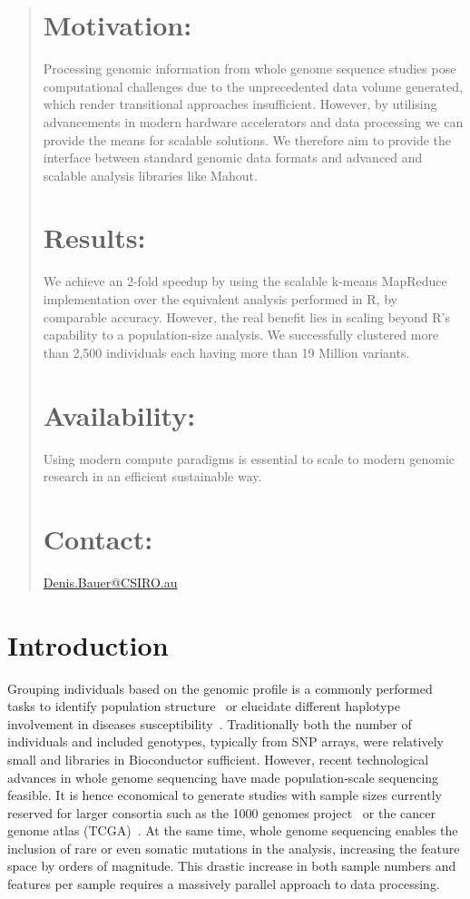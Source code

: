 \documentclass{bioinfo}
\begin{document}
\begin{abstract}

\section{Motivation:}
Processing genomic information from whole genome sequence studies pose computational challenges due to the unprecedented data volume generated, which render transitional approaches insufficient. However, by utilising advancements in modern hardware accelerators and data processing we can provide the means for scalable solutions. We therefore aim to provide the interface between standard genomic data formats and advanced and scalable analysis libraries like Mahout. 
\section{Results:}
We achieve an 2-fold speedup by using the scalable k-means MapReduce implementation over the equivalent analysis performed in R, by comparable accuracy. However, the real benefit lies in scaling beyond R's capability to a population-size analysis. We successfully clustered more than 2,500 individuals each having more than 19 Million variants. 

\section{Availability:}
Using modern compute paradigms is essential to scale to modern genomic research in an efficient sustainable way. 

\section{Contact:} \href{Denis.Bauer@CSIRO.au}{Denis.Bauer@CSIRO.au}
\end{abstract}

\section{Introduction}

Grouping individuals based on the genomic profile is a commonly performed tasks to identify population structure~\cite{Gao2007} or elucidate different haplotype involvement in diseases susceptibility~\cite{Laitman2013}.  Traditionally both the number of individuals and included genotypes, typically from SNP arrays, were relatively small and libraries in Bioconductor sufficient. However, recent technological advances in whole genome sequencing have made population-scale sequencing feasible. It is hence economical to generate studies with sample sizes currently reserved for larger consortia such as the 1000 genomes project~\cite{1KG2012} or the cancer genome atlas (TCGA)~\cite{TCGA2013}. At the same time, whole genome sequencing enables the inclusion of rare or even somatic mutations in the analysis, increasing the feature space by orders of magnitude. This drastic increase in both sample numbers and features per sample requires a massively parallel approach to data processing. 
\end{document}
